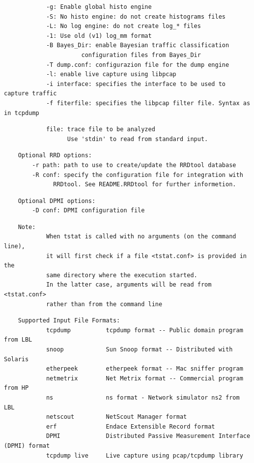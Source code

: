 \documentclass[11pt]{article}
\begin{document}
\begin{small}\begin{verbatim}
            -g: Enable global histo engine
            -S: No histo engine: do not create histograms files
            -L: No log engine: do not create log_* files
            -1: Use old (v1) log_mm format
            -B Bayes_Dir: enable Bayesian traffic classification
                      configuration files from Bayes_Dir
            -T dump.conf: configurazion file for the dump engine
            -l: enable live capture using libpcap
            -i interface: specifies the interface to be used to capture traffic
            -f fiterfile: specifies the libpcap filter file. Syntax as in tcpdump
\end{verbatim}\end{small} \noindent
\begin{small}\begin{verbatim}
            file: trace file to be analyzed
                  Use 'stdin' to read from standard input.
\end{verbatim}\end{small} \noindent
\begin{small}\begin{verbatim}
    Optional RRD options:
        -r path: path to use to create/update the RRDtool database
        -R conf: specify the configuration file for integration with 
              RRDtool. See README.RRDtool for further informetion.
\end{verbatim}\end{small} \noindent
\begin{small}\begin{verbatim}
    Optional DPMI options:
        -D conf: DPMI configuration file
\end{verbatim}\end{small} \noindent
\begin{small}\begin{verbatim}
    Note:
            When tstat is called with no arguments (on the command line),
            it will first check if a file <tstat.conf> is provided in the
            same directory where the execution started.
            In the latter case, arguments will be read from <tstat.conf>
            rather than from the command line
\end{verbatim}\end{small} \noindent
\begin{small}\begin{verbatim}
    Supported Input File Formats:
            tcpdump          tcpdump format -- Public domain program from LBL
            snoop            Sun Snoop format -- Distributed with Solaris
            etherpeek        etherpeek format -- Mac sniffer program
            netmetrix        Net Metrix format -- Commercial program from HP
            ns               ns format - Network simulator ns2 from LBL
            netscout         NetScout Manager format
            erf              Endace Extensible Record format
            DPMI             Distributed Passive Measurement Interface (DPMI) format
            tcpdump live     Live capture using pcap/tcpdump library
\end{verbatim}\end{small} \noindent
\end{document}
